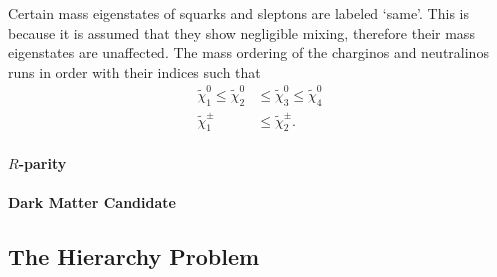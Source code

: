 \documentclass[12pt, oneside]{article}   	%
\begin{document}
\noindent Certain mass eigenstates of squarks and sleptons are labeled `same'.
This is because it is assumed that they show negligible mixing, therefore their mass eigenstates are unaffected.
The mass ordering of the charginos and neutralinos runs in order with their indices such that
\begin{align}
\tilde{\chi}^{0}_{1} \leq \tilde{\chi}^{0}_{2} &\leq \tilde{\chi}^{0}_{3} \leq \tilde{\chi}^{0}_{4} \\
\tilde{\chi}^{\pm}_{1} &\leq \tilde{\chi}^{\pm}_{2}.
\end{align}




\newpage
\paragraph{$R$-parity}
\paragraph{Dark Matter Candidate}
\subsection{The Hierarchy Problem}

\clearpage


\end{document}
